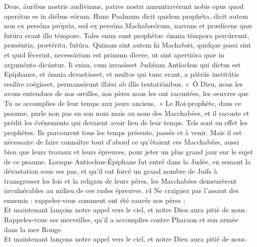 \documentclass[twoside]{article}
\begin{document}
\begin{paracol}[1]{2}
{		Deus, áuribus nostris audívimus, patres nostri annuntiavérunt nobis opus quod operátus es in diébus eórum. Hunc Psalmum dicit quidem prophéta, dicit autem non ex persóna própria, sed ex persóna Machabæórum, narrans et prædícens quæ futúra erant illo témpore. Tales enim sunt prophétæ: ómnia témpora percúrrunt, præséntia, prætérita, futúra. Quinam sint autem hi Machabǽi, quidque passi sint et quid fécerint, necessárium est primum dícere, ut sint apertióra quæ in arguménto dicúntur. Ii enim, cum invasísset Judǽam Antíochus qui dictus est Epíphanes, et ómnia devastásset, et multos qui tunc erant, a pátriis institútis resilíre coëgísset, permansérunt illǽsi ab illis tentatiónibus.
	}
	{«~Ô Dieu, nous les avons entendues de nos oreilles, nos pères nous les ont racontées, les oeuvres que Tu as accomplies de leur temps aux jours anciens.~» Le Roi-prophète, dans ce psaume, parle non pas en son nom mais au nom des Macchabées, et il raconte et prédit les événements qui devaient avoir lieu de leur temps. Tels sont en effet les prophètes. Ils parcourent tous les temps présents, passés et à venir. Mais il est nécessaire de faire connaître tout d'abord ce qu'étaient ces Macchabées, aussi bien que leurs travaux et leurs épreuves, pour jeter un plus grand jour sur le sujet de ce psaume. Lorsque Antiochus-Épiphane fut entré dans la Judée, en semant la dévastation sous ses pas, et qu'il eut forcé un grand nombre de Juifs à transgresser les lois et la religion de leurs pères, les Macchabées demeurèrent invulnérables au milieu de ces rudes épreuves.}
	{r4}
	{\rr Ne craignez pas l’assaut des ennemis : rappelez-vous comment ont été sauvés nos pères ;\\
	\GreSpecial{*} Et maintenant lançons notre appel vers le ciel, et notre Dieu aura pitié de nous.\\
	\vv Rappelez-vous ses merveilles, qu’il a accomplies contre Pharaon et son armée dans la mer Rouge.\\
	\GreSpecial{*} Et maintenant lançons notre appel vers le ciel, et notre Dieu aura pitié de nous.}


\end{paracol}
\end{document}
